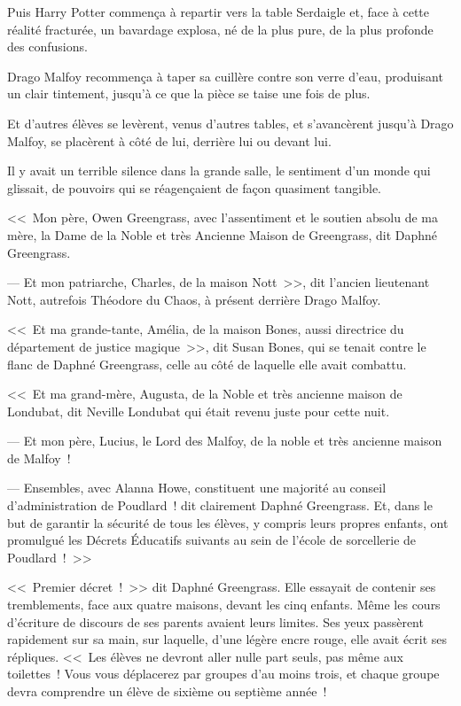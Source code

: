 Puis Harry Potter commença à repartir vers la table Serdaigle et, face à cette réalité fracturée, un bavardage explosa, né de la plus pure, de la plus profonde des confusions.

Drago Malfoy recommença à taper sa cuillère contre son verre d'eau, produisant un clair tintement, jusqu'à ce que la pièce se taise une fois de plus.

Et d'autres élèves se levèrent, venus d'autres tables, et s'avancèrent jusqu'à Drago Malfoy, se placèrent à côté de lui, derrière lui ou devant lui.

Il y avait un terrible silence dans la grande salle, le sentiment d'un monde qui glissait, de pouvoirs qui se réagençaient de façon quasiment tangible.

<<~Mon père, Owen Greengrass, avec l'assentiment et le soutien absolu de ma mère, la Dame de la Noble et très Ancienne Maison de Greengrass, dit Daphné Greengrass.

--- Et mon patriarche, Charles, de la maison Nott~>>, dit l'ancien lieutenant Nott, autrefois Théodore du Chaos, à présent derrière Drago Malfoy.

<<~Et ma grande-tante, Amélia, de la maison Bones, aussi directrice du département de justice magique~>>, dit Susan Bones, qui se tenait contre le flanc de Daphné Greengrass, celle au côté de laquelle elle avait combattu.

<<~Et ma grand-mère, Augusta, de la Noble et très ancienne maison de Londubat, dit Neville Londubat qui était revenu juste pour cette nuit.

--- Et mon père, Lucius, le Lord des Malfoy, de la noble et très ancienne maison de Malfoy~!

--- Ensembles, avec Alanna Howe, constituent une majorité au conseil d'administration de Poudlard~! dit clairement Daphné Greengrass. Et, dans le but de garantir la sécurité de tous les élèves, y compris leurs propres enfants, ont promulgué les Décrets Éducatifs suivants au sein de l'école de sorcellerie de Poudlard~!~>>

\later

<<~Premier décret~!~>> dit Daphné Greengrass. Elle essayait de contenir ses tremblements, face aux quatre maisons, devant les cinq enfants. Même les cours d'écriture de discours de ses parents avaient leurs limites. Ses yeux passèrent rapidement sur sa main, sur laquelle, d'une légère encre rouge, elle avait écrit ses répliques. <<~Les élèves ne devront aller nulle part seuls, pas même aux toilettes~! Vous vous déplacerez par groupes d'au moins trois, et chaque groupe devra comprendre un élève de sixième ou septième année~!

